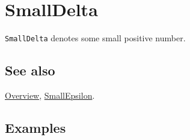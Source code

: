 \documentclass[../FeynCalcManual.tex]{subfiles}
\begin{document}
\hypertarget{smalldelta}{%
\section{SmallDelta}\label{smalldelta}}

\texttt{SmallDelta} denotes some small positive number.

\subsection{See also}

\hyperlink{toc}{Overview}, \hyperlink{smallepsilon}{SmallEpsilon}.

\subsection{Examples}
\end{document}
